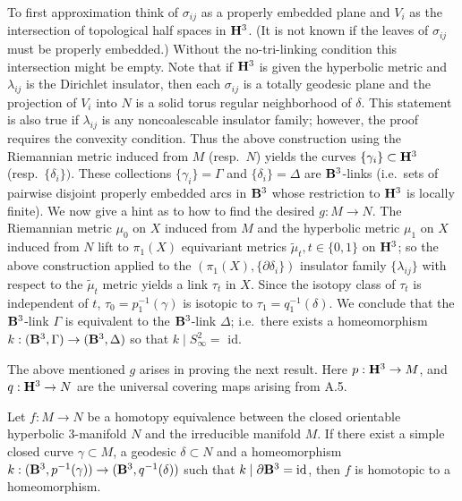 To first approximation think of $\sigma_{ij}$ as a properly embedded plane
and $V_i$ as
the intersection of topological half spaces in ${\bf H}^3$.  
(It is not known if the leaves of
$\sigma_{ij}$ must be properly embedded.)
Without the
no-tri-linking
condition this intersection might be empty.  Note that if ${\bf H}^3$ is given the
hyperbolic metric and $\lambda_{ij}$ is the Dirichlet insulator, then each
$\sigma_{ij}$ is a totally geodesic plane and the projection of $V_i$ into
$N$ is a
solid torus regular neighborhood of $\delta$.  This statement is also true if
$\lambda_{ij}$ is any noncoalescable insulator family; however, the proof
requires the
convexity condition.   Thus the above construction using the Riemannian
metric induced
from $M$ (resp.\ $N$) yields the curves $\{\gamma_i\}\subset
{\bf H}^3$ (resp.\ $\{\delta_i\})$.  
These collections $\{\gamma_i\}=\Gamma$ and 
$\{\delta_i\}=\Delta$ are
${\bf B}^3$-links (i.e.\ sets of pairwise disjoint properly embedded arcs in
${\bf B}^3$ whose
restriction to ${\bf H}^3$ is locally finite). 
We now give a hint as to how to find the desired $g:M\to N$.
  The
Riemannian metric
$\mu_0$ on $X$ induced from $M$ and the hyperbolic metric
$\mu_1$ on $X$ induced from $N$
lift
to
$\pi_1(X)$ equivariant metrics $\tilde\mu_t, t\in \{0,1\}$ on  ${\bf H}^3$; so
the above construction  applied to the  $(\pi_1(X),\{\partial\delta_i\})$
insulator family
$\{\lambda_{ij}\}$ with respect
to the  $\tilde\mu_t$ metric  yields   a link $\tau_t$  in $X$.
Since the
isotopy class of $\tau_t$ is independent of $t$,  $\tau_0=p_1^{-1}(\gamma)$  is isotopic to  $\tau_1=q_1^{-1}(\delta)$.  We  conclude
that the
${\bf B}^3$-link $\Gamma$ is  equivalent to the ${\bf B}^3$-link
$\Delta$; i.e.\ there exists a homeomorphism $k:( {\bf B}^3,\Gamma) \to
({\bf B}^3,\Delta)$ so that $k\mid S^2_{\infty}=$ id.

The above mentioned $g$ arises in proving the next result.  Here
$p: {\bf H}^3\to M$, and $q: {\bf H}^3\to N$ are the universal covering maps arising
from A.5.

  Let $f:M\to N$ be a homotopy
equivalence
between the closed orientable hyperbolic $3$\/{\rm -}\/manifold $N$ and
the
irreducible manifold
$M$.
If there exist  a simple closed curve  $\gamma\subset M${\rm ,} a
geodesic $\delta \subset N$ and a homeomorphism
$k:({\bf B}^3,p^{-1}(\gamma))\to
({\bf B}^3,q^{-1}(\delta))$ such that $k\mid \partial {\bf B}^3  = {\rm id}${\rm ,}
then
$f$ is
homotopic to
a homeomorphism. 
\endproclaim

